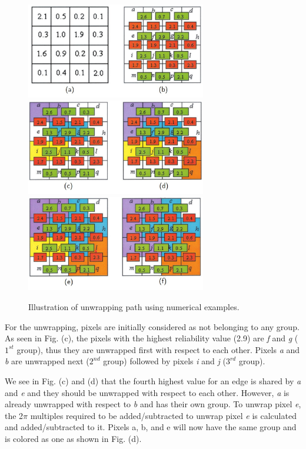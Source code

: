 \captionsetup[figure]{width=6in}
\begin{figure}[h!]
	\centering
	\includegraphics[width=0.7\textwidth]{figures/unwrap1.jpg}
	\includegraphics[width=0.7\textwidth]{figures/unwrap2.jpg}
	\includegraphics[width=0.7\textwidth]{figures/unwrap3.jpg}
	\caption[Unwrapping path]{Illustration of unwrapping path using numerical examples.}
	\label{fig:unwrap}
\end{figure}

For the unwrapping, pixels are initially considered as not belonging to any group. As seen in Fig. (c), the pixels with the highest reliability value (2.9) are \textit{f} and \textit{g} ($1^{st}$ group), thus they are unwrapped first with respect to each other. Pixels \textit{a} and \textit{b} are unwrapped next ($2^{nd}$ group) followed by pixels \textit{i} and \textit{j} ($3^{rd}$ group).

We see in Fig. (c) and (d) that the fourth highest value for an edge is shared by \textit{a} and \textit{e} and they should be unwrapped with respect to each other. However, \textit{a} is already unwrapped with respect to \textit{b} and has their own group. To unwrap pixel \textit{e}, the 2$\pi$ multiples required to be added/subtracted to unwrap pixel \textit{e} is calculated and added/subtracted to it. Pixels a, b, and e will now have the same group and is colored as one as shown in Fig. (d). 

